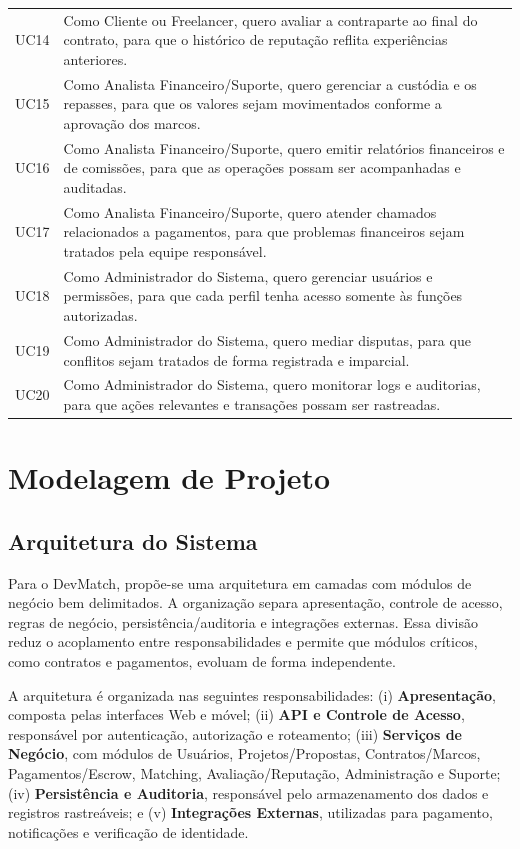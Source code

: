\begin{table}[!htbp]
\begin{tabularx}{\textwidth}{@{}p{0.9cm}X@{}}
UC14 & Como Cliente ou Freelancer, quero avaliar a contraparte ao final do contrato, para que o histórico de reputação reflita experiências anteriores. \\
UC15 & Como Analista Financeiro/Suporte, quero gerenciar a custódia e os repasses, para que os valores sejam movimentados conforme a aprovação dos marcos. \\
UC16 & Como Analista Financeiro/Suporte, quero emitir relatórios financeiros e de comissões, para que as operações possam ser acompanhadas e auditadas. \\
UC17 & Como Analista Financeiro/Suporte, quero atender chamados relacionados a pagamentos, para que problemas financeiros sejam tratados pela equipe responsável. \\
UC18 & Como Administrador do Sistema, quero gerenciar usuários e permissões, para que cada perfil tenha acesso somente às funções autorizadas. \\
UC19 & Como Administrador do Sistema, quero mediar disputas, para que conflitos sejam tratados de forma registrada e imparcial. \\
UC20 & Como Administrador do Sistema, quero monitorar logs e auditorias, para que ações relevantes e transações possam ser rastreadas. \\
\bottomrule
\end{tabularx}
\end{table}

\section{Modelagem de Projeto}
\label{sec:projeto}

\subsection{Arquitetura do Sistema}
\label{sec:arquitetura}

Para o DevMatch, propõe-se uma arquitetura em camadas com módulos de negócio bem delimitados. A organização separa apresentação, controle de acesso, regras de negócio, persistência/auditoria e integrações externas. Essa divisão reduz o acoplamento entre responsabilidades e permite que módulos críticos, como contratos e pagamentos, evoluam de forma independente.

A arquitetura é organizada nas seguintes responsabilidades: (i) \textbf{Apresentação}, composta pelas interfaces Web e móvel; (ii) \textbf{API e Controle de Acesso}, responsável por autenticação, autorização e roteamento; (iii) \textbf{Serviços de Negócio}, com módulos de Usuários, Projetos/Propostas, Contratos/Marcos, Pagamentos/Escrow, Matching, Avaliação/Reputação, Administração e Suporte; (iv) \textbf{Persistência e Auditoria}, responsável pelo armazenamento dos dados e registros rastreáveis; e (v) \textbf{Integrações Externas}, utilizadas para pagamento, notificações e verificação de identidade.

